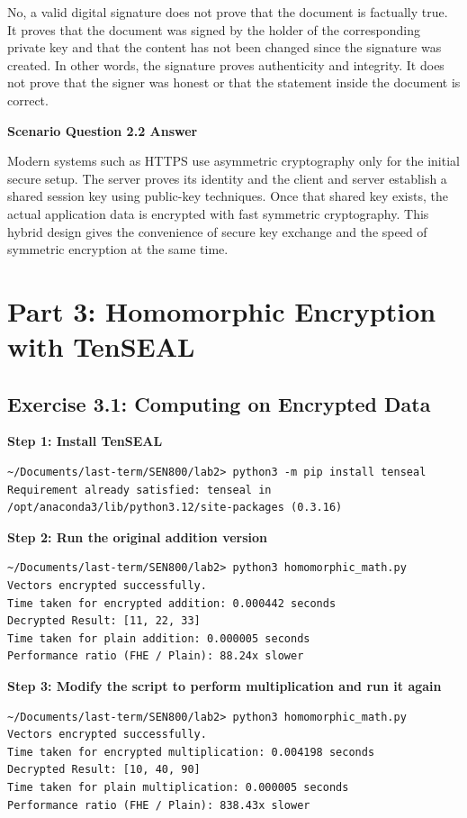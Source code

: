 \documentclass[12pt]{article}
\begin{document}
No, a valid digital signature does not prove that the document is factually true. It proves that the document was signed by the holder of the corresponding private key and that the content has not been changed since the signature was created. In other words, the signature proves authenticity and integrity. It does not prove that the signer was honest or that the statement inside the document is correct.

\textbf{Scenario Question 2.2 Answer}

Modern systems such as HTTPS use asymmetric cryptography only for the initial secure setup. The server proves its identity and the client and server establish a shared session key using public-key techniques. Once that shared key exists, the actual application data is encrypted with fast symmetric cryptography. This hybrid design gives the convenience of secure key exchange and the speed of symmetric encryption at the same time.

\section*{Part 3: Homomorphic Encryption with TenSEAL}

\subsection*{Exercise 3.1: Computing on Encrypted Data}

\textbf{Step 1: Install TenSEAL}

\begin{lstlisting}[style=terminal]
~/Documents/last-term/SEN800/lab2> python3 -m pip install tenseal
Requirement already satisfied: tenseal in /opt/anaconda3/lib/python3.12/site-packages (0.3.16)
\end{lstlisting}

\textbf{Step 2: Run the original addition version}

\begin{lstlisting}[style=terminal]
~/Documents/last-term/SEN800/lab2> python3 homomorphic_math.py
Vectors encrypted successfully.
Time taken for encrypted addition: 0.000442 seconds
Decrypted Result: [11, 22, 33]
Time taken for plain addition: 0.000005 seconds
Performance ratio (FHE / Plain): 88.24x slower
\end{lstlisting}

\textbf{Step 3: Modify the script to perform multiplication and run it again}

\begin{lstlisting}[style=terminal]
~/Documents/last-term/SEN800/lab2> python3 homomorphic_math.py
Vectors encrypted successfully.
Time taken for encrypted multiplication: 0.004198 seconds
Decrypted Result: [10, 40, 90]
Time taken for plain multiplication: 0.000005 seconds
Performance ratio (FHE / Plain): 838.43x slower
\end{lstlisting}
\end{document}
